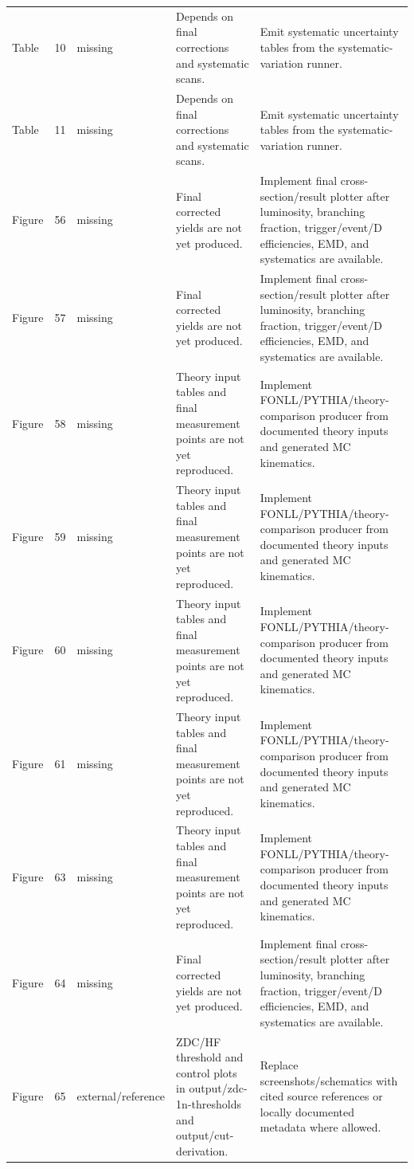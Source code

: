 \documentclass[11pt]{article}
\begin{document}
\begin{longtable}{lll p{} p{}}
Table & 10 & missing & Depends on final corrections and systematic scans. & Emit systematic uncertainty tables from the systematic-variation runner. \\
Table & 11 & missing & Depends on final corrections and systematic scans. & Emit systematic uncertainty tables from the systematic-variation runner. \\
Figure & 56 & missing & Final corrected yields are not yet produced. & Implement final cross-section/result plotter after luminosity, branching fraction, trigger/event/D efficiencies, EMD, and systematics are available. \\
Figure & 57 & missing & Final corrected yields are not yet produced. & Implement final cross-section/result plotter after luminosity, branching fraction, trigger/event/D efficiencies, EMD, and systematics are available. \\
Figure & 58 & missing & Theory input tables and final measurement points are not yet reproduced. & Implement FONLL/PYTHIA/theory-comparison producer from documented theory inputs and generated MC kinematics. \\
Figure & 59 & missing & Theory input tables and final measurement points are not yet reproduced. & Implement FONLL/PYTHIA/theory-comparison producer from documented theory inputs and generated MC kinematics. \\
Figure & 60 & missing & Theory input tables and final measurement points are not yet reproduced. & Implement FONLL/PYTHIA/theory-comparison producer from documented theory inputs and generated MC kinematics. \\
Figure & 61 & missing & Theory input tables and final measurement points are not yet reproduced. & Implement FONLL/PYTHIA/theory-comparison producer from documented theory inputs and generated MC kinematics. \\
Figure & 63 & missing & Theory input tables and final measurement points are not yet reproduced. & Implement FONLL/PYTHIA/theory-comparison producer from documented theory inputs and generated MC kinematics. \\
Figure & 64 & missing & Final corrected yields are not yet produced. & Implement final cross-section/result plotter after luminosity, branching fraction, trigger/event/D efficiencies, EMD, and systematics are available. \\
Figure & 65 & external/reference & ZDC/HF threshold and control plots in output/zdc-1n-thresholds and output/cut-derivation. & Replace screenshots/schematics with cited source references or locally documented metadata where allowed. \\

\end{longtable}
\end{document}
